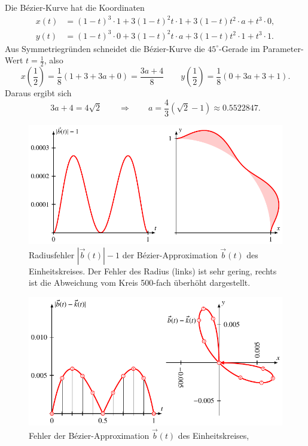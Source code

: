 \begin{loesung}
Die Bézier-Kurve hat die Koordinaten
\begin{align*}
x(t)
&=
(1-t)^3\cdot1
+
3(1-t)^2t\cdot1
+
3(1-t)t^2\cdot a
+
t^3\cdot 0,
\\
y(t)
&=
(1-t)^3\cdot0
+
3(1-t)^2t\cdot a
+
3(1-t)t^2\cdot 1
+
t^3\cdot 1.
\end{align*}
Aus Symmetriegründen schneidet die Bézier-Kurve die $45^\circ$-Gerade
im Parameter-Wert $t=\frac12$, also
\[
x({\textstyle\frac12})
=
\frac18(1+3+3a+0)
=
\frac{3a+4}8
\qquad
y({\textstyle\frac12})
=
\frac18(0+3a+3+1).
\]
Daraus ergibt sich 
\[
3a+4=4\sqrt{2}
\qquad\Rightarrow\qquad
a = \frac43(\sqrt{2}-1)
\approx
0.5522847.
\]
\begin{figure}
\centering
\includegraphics{chapters/30-interpolation/uebungsaufgaben/radiusfehler.pdf}
\caption{Radiusfehler $|\vec{b}(t)|-1$ der Bézier-Approximation $\vec{b}(t)$
des Einheitskreises.
Der Fehler des Radius (links) ist sehr gering, rechts ist die Abweichung
vom Kreis 500-fach überhöht dargestellt.
\label{3003:figure:radiusfehler}}
\end{figure}
\begin{figure}
\centering
\includegraphics{chapters/30-interpolation/uebungsaufgaben/abweichungen.pdf}
\caption{Fehler der Bézier-Approximation $\vec{b}(t)$ des Einheitskreises,
}
\end{figure}
\end{loesung}
